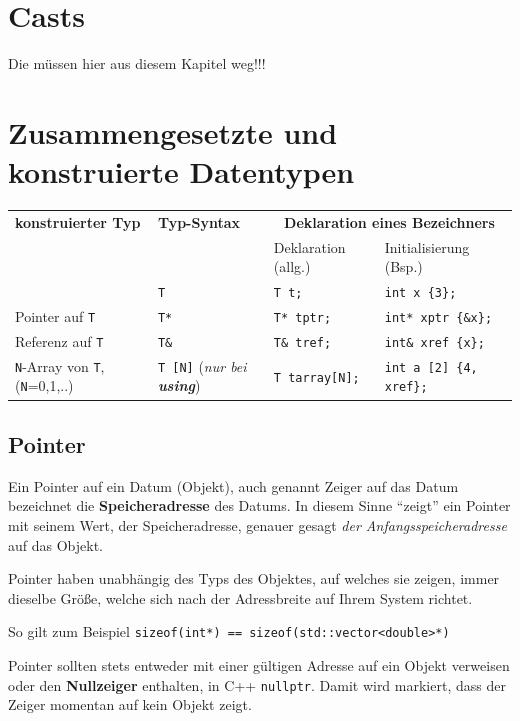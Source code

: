 \documentclass[a4paper]{report}
\begin{document}
\section{Casts}
	Die müssen hier aus diesem Kapitel weg!!!
\section{Zusammengesetzte und konstruierte Datentypen}

\begin{center}
	\begin{tabular}{|l|l|l|l|} \hline
		\textbf{konstruierter Typ} & \textbf{Typ-Syntax} & \multicolumn{2}{c|}{\textbf{Deklaration eines Bezeichners}}\\ 
		&& Deklaration (allg.) & Initialisierung (Bsp.) \\ \hline
		[identischer Typ] & \texttt{T} & \texttt{T t;} & \texttt{int x \{3\};} \\ \hline
		Pointer auf \texttt{T} & \texttt{T*} & \texttt{T* tptr;} & \texttt{int* xptr \{\&x\};} \\ \hline
		Referenz auf \texttt{T} & \texttt{T\&} & \texttt{T\& tref;} & \texttt{int\& xref \{x\};} \\ \hline
		\texttt{N}-Array von \texttt{T}, (\texttt{N}=0,1,..)& \texttt{T [N]} (\textit{nur bei \textbf{using}}) & \texttt{T tarray[N];} & \texttt{int a [2] \{4, xref\};} \\ \hline
	\end{tabular}
\end{center}

\subsection{Pointer}
Ein Pointer auf ein Datum (Objekt), auch genannt Zeiger auf das Datum bezeichnet die \textbf{Speicheradresse} des Datums. In diesem Sinne "`zeigt"' ein Pointer mit seinem Wert, der Speicheradresse, genauer gesagt \textit{der Anfangsspeicheradresse} auf das Objekt.

Pointer haben unabhängig des Typs des Objektes, auf welches sie zeigen, immer dieselbe Größe, welche sich nach der Adressbreite auf Ihrem System richtet.

So gilt zum Beispiel \texttt{sizeof(int*) == sizeof(std::vector<double>*)}

Pointer sollten stets entweder mit einer gültigen Adresse auf ein Objekt verweisen oder den \textbf{Nullzeiger} enthalten, in C++ \texttt{nullptr}. Damit wird markiert, dass der Zeiger momentan auf kein Objekt zeigt.
\end{document}
